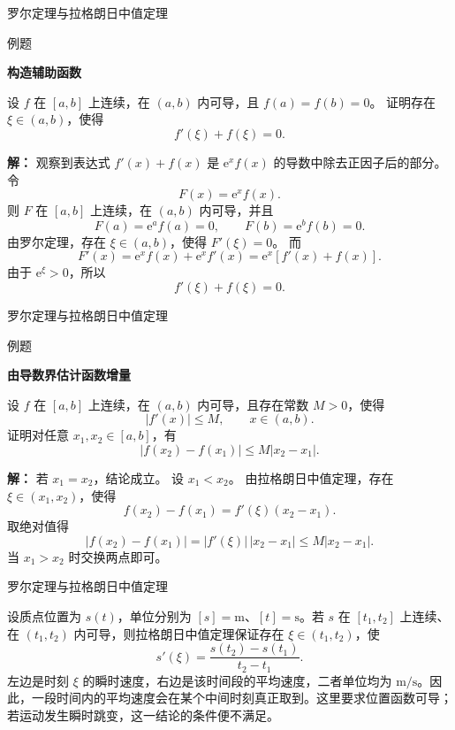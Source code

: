 \documentclass[aspectratio=169,10pt,fontset=fandol]{ctexbeamer}
\newcommand{\ee}{\mathrm{e}}
\begin{document}
\begin{frame}[t,fragile]{罗尔定理与拉格朗日中值定理}
\small
\begin{block}{例题}
{\small
\textbf{构造辅助函数}\par

设 $f$ 在 $[a,b]$ 上连续，在 $(a,b)$ 内可导，且 $f(a)=f(b)=0$。 证明存在 $\xi\in(a,b)$，使得
\[
f'(\xi)+f(\xi)=0.
\]

}
\end{block}
\pause
{\small
\textbf{解：}
观察到表达式 $f'(x)+f(x)$ 是 $\ee^x f(x)$ 的导数中除去正因子后的部分。 令
\[
F(x)=\ee^x f(x).
\]
则 $F$ 在 $[a,b]$ 上连续，在 $(a,b)$ 内可导，并且
\[
F(a)=\ee^a f(a)=0,\qquad F(b)=\ee^b f(b)=0.
\]
由罗尔定理，存在 $\xi\in(a,b)$，使得 $F'(\xi)=0$。 而
\[
F'(x)=\ee^x f(x)+\ee^x f'(x)=\ee^x[f'(x)+f(x)].
\]
由于 $\ee^\xi>0$，所以
\[
f'(\xi)+f(\xi)=0.
\]

}
\end{frame}
\begin{frame}[t,fragile]{罗尔定理与拉格朗日中值定理}
\small
\begin{block}{例题}
{\small
\textbf{由导数界估计函数增量}\par

设 $f$ 在 $[a,b]$ 上连续，在 $(a,b)$ 内可导，且存在常数 $M>0$，使得
\[
|f'(x)|\leq M,\qquad x\in(a,b).
\]
证明对任意 $x_1,x_2\in[a,b]$，有
\[
|f(x_2)-f(x_1)|\leq M|x_2-x_1|.
\]

}
\end{block}
\pause
{\small
\textbf{解：}
若 $x_1=x_2$，结论成立。 设 $x_1<x_2$。 由拉格朗日中值定理，存在 $\xi\in(x_1,x_2)$，使得
\[
f(x_2)-f(x_1)=f'(\xi)(x_2-x_1).
\]
取绝对值得
\[
|f(x_2)-f(x_1)|=|f'(\xi)|\,|x_2-x_1|\leq M|x_2-x_1|.
\]
当 $x_1>x_2$ 时交换两点即可。

}
\end{frame}
\begin{frame}[t,fragile]{罗尔定理与拉格朗日中值定理}
\normalsize
{\normalsize
\begin{application}[物理：平均速度与瞬时速度]
设质点位置为 $s(t)$，单位分别为 $[s]=\mathrm m$、$[t]=\mathrm s$。若 $s$ 在 $[t_1,t_2]$ 上连续、在 $(t_1,t_2)$ 内可导，则拉格朗日中值定理保证存在 $\xi\in(t_1,t_2)$，使
\[
s'(\xi)=\frac{s(t_2)-s(t_1)}{t_2-t_1}.
\]
左边是时刻 $\xi$ 的瞬时速度，右边是该时间段的平均速度，二者单位均为 $\mathrm{m/s}$。因此，一段时间内的平均速度会在某个中间时刻真正取到。这里要求位置函数可导；若运动发生瞬时跳变，这一结论的条件便不满足。
\end{application}
}
\end{frame}
\end{document}
